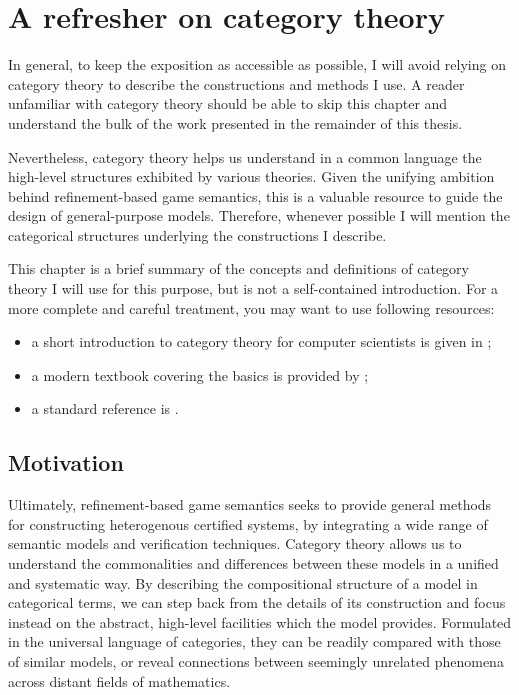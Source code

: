 \documentclass[11pt,oneside,draft]{book}
\theoremstyle{definition}
\begin{document}



\chapter{A refresher on category theory} \label{chap:ct} %


In general,
to keep the exposition
as accessible as possible,
I will avoid relying on category theory
to describe the constructions and methods
I use.
A reader unfamiliar with category theory
should be able to skip this chapter
and understand the bulk of the work presented
in the remainder of this thesis.

Nevertheless,
category theory
helps us understand
in a common language
the high-level structures
exhibited by various theories.
Given the unifying ambition behind
refinement-based game semantics,
this is a valuable resource
to guide the design of general-purpose models.
Therefore,
whenever possible I will mention the categorical structures
underlying the constructions I describe.

This chapter is a brief summary of the concepts and definitions
of category theory I will use for this purpose,
but is not a self-contained introduction.
For a more complete and careful treatment,
you may want to use following resources:
\begin{itemize}
  \item
    a short introduction to category theory for computer scientists
    is given in \citet{ctcs};
  \item
    a modern textbook covering the basics is provided by \cite{awodeyct};
  \item
    a standard reference is \cite{maclane}.
\end{itemize}


\section{Motivation} %

Ultimately,
refinement-based game semantics seeks
to provide general methods for
constructing heterogenous certified systems,
by integrating a wide range of
semantic models and verification techniques.
Category theory allows us to
understand the commonalities and differences
between these models
in a unified and systematic way.
By describing the compositional structure of a model
in categorical terms,
we can step back from the details of its construction
and focus instead on
the abstract, high-level facilities which the model provides.
Formulated
in the universal language of categories,
they can be readily compared with those of similar models,
or reveal connections between
seemingly unrelated phenomena across
distant fields of mathematics.
\end{document}
